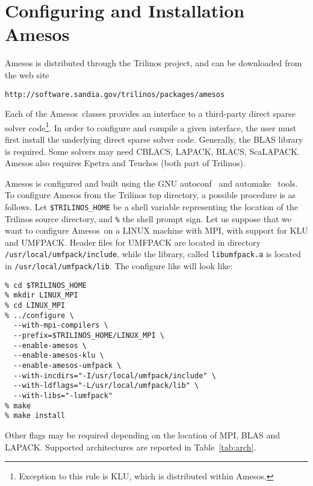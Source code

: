 \documentclass[11pt]{SANDreport}
\newcommand{\amesos}{{\sc Amesos}}
\begin{document}
\section{Configuring and Installation Amesos}
\label{sec:configuration}

Amesos is distributed through the Trilinos project, and can be
downloaded from the web site
\begin{verbatim}
http://software.sandia.gov/trilinos/packages/amesos
\end{verbatim}

\smallskip

Each of the \amesos\ classes provides an interface to a third-party direct
sparse solver code\footnote{Exception to this rule is KLU, which is
  distributed within Amesos.}. In order to configure and compile a given
interface, the user must first install the underlying direct sparse
solver code. Generally, the BLAS library is required. Some solvers may
need CBLACS, LAPACK, BLACS, ScaLAPACK. Amesos also requires Epetra and
Teuchos (both part of Trilinos).

Amesos is configured and built using the GNU autoconf~\cite{Autoconf}
and automake~\cite{Automake} tools. To configure Amesos from the
Trilinos top directory, a possible procedure is as follows.  Let
\verb!$TRILINOS_HOME! be a shell variable representing the location
of the Trilinos source directory, and \verb!%! the shell prompt sign.  
Let us suppose that we want to configure \amesos\ on a
LINUX machine with MPI, with support
for KLU and UMFPACK. Header files for UMFPACK are located
in directory \verb!/usr/local/umfpack/include!, while the library,
called \verb!libumfpack.a! is located in \verb!/usr/local/umfpack/lib!.
The configure like will look like:
\begin{verbatim}
% cd $TRILINOS_HOME
% mkdir LINUX_MPI
% cd LINUX_MPI
% ../configure \
  --with-mpi-compilers \
  --prefix=$TRILINOS_HOME/LINUX_MPI \
  --enable-amesos \
  --enable-amesos-klu \
  --enable-amesos-umfpack \
  --with-incdirs="-I/usr/local/umfpack/include" \
  --with-ldflags="-L/usr/local/umfpack/lib" \
  --with-libs="-lumfpack"
% make
% make install
\end{verbatim}
Other flags may be required depending on the location of
 MPI, BLAS and LAPACK. Supported architectures are reported 
 in Table~\ref{tab:arch}.
\end{document}
